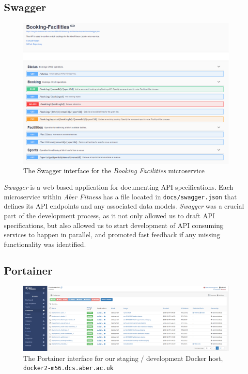 \subsection{Swagger}
\begin{figure}[H]
    \centering
    \includegraphics[width=\textwidth]{Images/Swagger.png}
    \caption{The Swagger interface for the \textit{Booking Facilities} microservice}
    \label{fig:swagger_ui}
\end{figure}

\textit{Swagger} is a web based application for documenting API specifications. Each microservice within \textit{Aber Fitness} has a file located in \lstinline{docs/swagger.json} that defines its API endpoints and any associated data models. \textit{Swagger} was a crucial part of the development process, as it not only allowed us to draft API specifications, but also allowed us to start development of API consuming services to happen in parallel, and promoted fast feedback if any missing functionality was identified.

\subsection{Portainer}
\begin{figure}[H]
    \centering
    \includegraphics[width=\textwidth]{Images/Portainer.png}
    \caption{The Portainer interface for our staging / development Docker host, \lstinline{docker2-m56.dcs.aber.ac.uk}}
    \label{fig:portainer_ui}
\end{figure}

